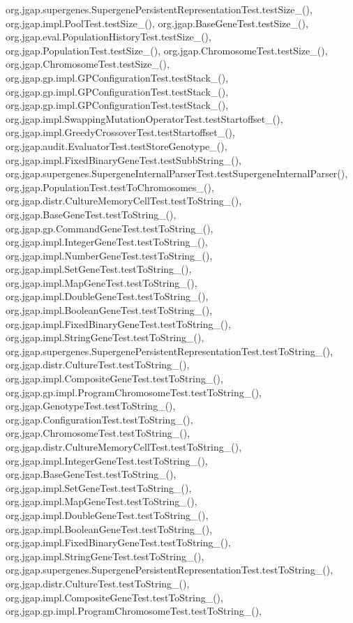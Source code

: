 org.\-jgap.\-supergenes.\-Supergene\-Persistent\-Representation\-Test.\-test\-Size\-\_(), org.\-jgap.\-impl.\-Pool\-Test.\-test\-Size\-\_(), org.\-jgap.\-Base\-Gene\-Test.\-test\-Size\-\_(), org.\-jgap.\-eval.\-Population\-History\-Test.\-test\-Size\-\_(), org.\-jgap.\-Population\-Test.\-test\-Size\-\_(), org.\-jgap.\-Chromosome\-Test.\-test\-Size\-\_(), org.\-jgap.\-Chromosome\-Test.\-test\-Size\-\_(), org.\-jgap.\-gp.\-impl.\-G\-P\-Configuration\-Test.\-test\-Stack\-\_(), org.\-jgap.\-gp.\-impl.\-G\-P\-Configuration\-Test.\-test\-Stack\-\_(), org.\-jgap.\-gp.\-impl.\-G\-P\-Configuration\-Test.\-test\-Stack\-\_(), org.\-jgap.\-impl.\-Swapping\-Mutation\-Operator\-Test.\-test\-Startoffset\-\_(), org.\-jgap.\-impl.\-Greedy\-Crossover\-Test.\-test\-Startoffset\-\_(), org.\-jgap.\-audit.\-Evaluator\-Test.\-test\-Store\-Genotype\-\_(), org.\-jgap.\-impl.\-Fixed\-Binary\-Gene\-Test.\-test\-Subb\-String\-\_(), org.\-jgap.\-supergenes.\-Supergene\-Internal\-Parser\-Test.\-test\-Supergene\-Internal\-Parser(), org.\-jgap.\-Population\-Test.\-test\-To\-Chromosomes\-\_(), org.\-jgap.\-distr.\-Culture\-Memory\-Cell\-Test.\-test\-To\-String\-\_(), org.\-jgap.\-Base\-Gene\-Test.\-test\-To\-String\-\_(), org.\-jgap.\-gp.\-Command\-Gene\-Test.\-test\-To\-String\-\_(), org.\-jgap.\-impl.\-Integer\-Gene\-Test.\-test\-To\-String\-\_(), org.\-jgap.\-impl.\-Number\-Gene\-Test.\-test\-To\-String\-\_(), org.\-jgap.\-impl.\-Set\-Gene\-Test.\-test\-To\-String\-\_(), org.\-jgap.\-impl.\-Map\-Gene\-Test.\-test\-To\-String\-\_(), org.\-jgap.\-impl.\-Double\-Gene\-Test.\-test\-To\-String\-\_(), org.\-jgap.\-impl.\-Boolean\-Gene\-Test.\-test\-To\-String\-\_(), org.\-jgap.\-impl.\-Fixed\-Binary\-Gene\-Test.\-test\-To\-String\-\_(), org.\-jgap.\-impl.\-String\-Gene\-Test.\-test\-To\-String\-\_(), org.\-jgap.\-supergenes.\-Supergene\-Persistent\-Representation\-Test.\-test\-To\-String\-\_(), org.\-jgap.\-distr.\-Culture\-Test.\-test\-To\-String\-\_(), org.\-jgap.\-impl.\-Composite\-Gene\-Test.\-test\-To\-String\-\_(), org.\-jgap.\-gp.\-impl.\-Program\-Chromosome\-Test.\-test\-To\-String\-\_(), org.\-jgap.\-Genotype\-Test.\-test\-To\-String\-\_(), org.\-jgap.\-Configuration\-Test.\-test\-To\-String\-\_(), org.\-jgap.\-Chromosome\-Test.\-test\-To\-String\-\_(), org.\-jgap.\-distr.\-Culture\-Memory\-Cell\-Test.\-test\-To\-String\-\_(), org.\-jgap.\-impl.\-Integer\-Gene\-Test.\-test\-To\-String\-\_(), org.\-jgap.\-Base\-Gene\-Test.\-test\-To\-String\-\_(), org.\-jgap.\-impl.\-Set\-Gene\-Test.\-test\-To\-String\-\_(), org.\-jgap.\-impl.\-Map\-Gene\-Test.\-test\-To\-String\-\_(), org.\-jgap.\-impl.\-Double\-Gene\-Test.\-test\-To\-String\-\_(), org.\-jgap.\-impl.\-Boolean\-Gene\-Test.\-test\-To\-String\-\_(), org.\-jgap.\-impl.\-Fixed\-Binary\-Gene\-Test.\-test\-To\-String\-\_(), org.\-jgap.\-impl.\-String\-Gene\-Test.\-test\-To\-String\-\_(), org.\-jgap.\-supergenes.\-Supergene\-Persistent\-Representation\-Test.\-test\-To\-String\-\_(), org.\-jgap.\-distr.\-Culture\-Test.\-test\-To\-String\-\_(), org.\-jgap.\-impl.\-Composite\-Gene\-Test.\-test\-To\-String\-\_(), org.\-jgap.\-gp.\-impl.\-Program\-Chromosome\-Test.\-test\-To\-String\-\_(), 